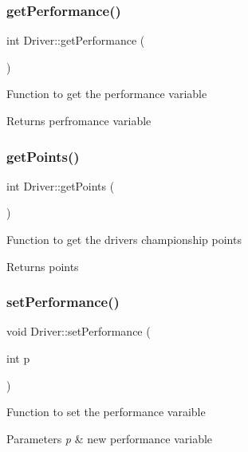 \subsubsection{\texorpdfstring{get\+Performance()}{getPerformance()}}
{\footnotesize\ttfamily int Driver\+::get\+Performance (\begin{DoxyParamCaption}{ }\end{DoxyParamCaption})}

Function to get the performance variable \begin{DoxyReturn}{Returns}
perfromance variable 
\end{DoxyReturn}
\mbox{\label{classDriver_a7d527bc5a262fcba16f239103969bbc3}} 
\subsubsection{\texorpdfstring{get\+Points()}{getPoints()}}
{\footnotesize\ttfamily int Driver\+::get\+Points (\begin{DoxyParamCaption}{ }\end{DoxyParamCaption})}

Function to get the drivers championship points \begin{DoxyReturn}{Returns}
points 
\end{DoxyReturn}
\mbox{\label{classDriver_aa8e4524d765561c16d2bf6072e963e83}} 
\subsubsection{\texorpdfstring{set\+Performance()}{setPerformance()}}
{\footnotesize\ttfamily void Driver\+::set\+Performance (\begin{DoxyParamCaption}\item[{int}]{p }\end{DoxyParamCaption})}

Function to set the performance varaible 
\begin{DoxyParams}{Parameters}
{\em p} & new performance variable \\
\hline
\end{DoxyParams}
\mbox{\label{classDriver_a10b1b27d8d99ed19304b69727f0a0504}} 
